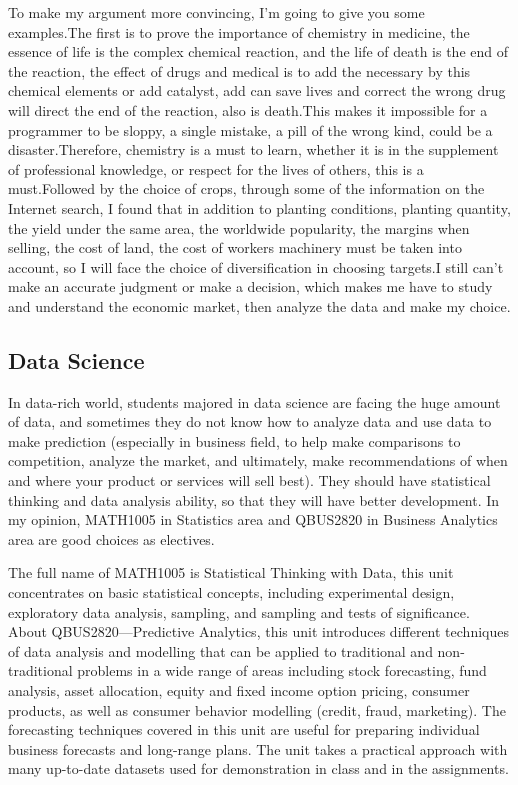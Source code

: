 \documentclass[12pt]{article}
\begin{document}
To make my argument more convincing, I'm going to give you some examples.The first is to prove the importance of chemistry in medicine, the essence of life is the complex chemical reaction, and the life of death is the end of the reaction, the effect of drugs and medical is to add the necessary by this chemical elements or add catalyst, add can save lives and correct the wrong drug will direct the end of the reaction, also is death.This makes it impossible for a programmer to be sloppy, a single mistake, a pill of the wrong kind, could be a disaster.Therefore, chemistry is a must to learn, whether it is in the supplement of professional knowledge, or respect for the lives of others, this is a must.Followed by the choice of crops, through some of the information on the Internet search, I found that in addition to planting conditions, planting quantity, the yield under the same area, the worldwide popularity, the margins when selling, the cost of land, the cost of workers machinery must be taken into account, so I will face the choice of diversification in choosing targets.I still can't make an accurate judgment or make a decision, which makes me have to study and understand the economic market, then analyze the data and make my choice.

\newpage
\subsection{Data Science}
In data-rich world, students majored in data science are facing the huge amount of data, and sometimes they do not know how to analyze data and use data to make prediction (especially in business field, to help make comparisons to competition, analyze the market, and ultimately, make recommendations of when and where your product or services will sell best). They should have statistical thinking and data analysis ability, so that they will have better development. In my opinion, MATH1005 in Statistics area and QBUS2820 in Business Analytics area are good choices as electives.

The full name of MATH1005 is Statistical Thinking with Data, this unit concentrates on basic statistical concepts, including experimental design, exploratory data analysis, sampling, and sampling and tests of significance. About QBUS2820—Predictive Analytics, this unit introduces different techniques of data analysis and modelling that can be applied to traditional and non-traditional problems in a wide range of areas including stock forecasting, fund analysis, asset allocation, equity and fixed income option pricing, consumer products, as well as consumer behavior modelling (credit, fraud, marketing). The forecasting techniques covered in this unit are useful for preparing individual business forecasts and long-range plans. The unit takes a practical approach with many up-to-date datasets used for demonstration in class and in the assignments.
\end{document}
